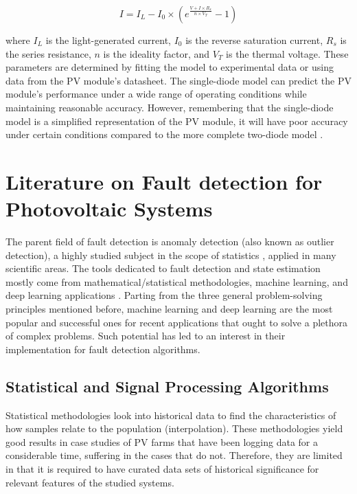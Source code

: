 \begin{equation}
I = I_{L} - I_{0} \times (e^{\frac{V + I \times R_{s}}{n \times V_T}} - 1)
\end{equation}

where $I_{L}$ is the light-generated current, $I_{0}$ is the reverse saturation current, $R_{s}$ is the series resistance, $n$ is the ideality factor, and $V_{T}$ is the thermal voltage. These parameters are determined by fitting the model to experimental data or using data from the PV module's datasheet. The single-diode model can predict the PV module's performance under a wide range of operating conditions while maintaining reasonable accuracy. However, remembering that the single-diode model is a simplified representation of the PV module, it will have poor accuracy under certain conditions compared to the more complete two-diode model \cite{Godina2017}.


\section{Literature on Fault detection for Photovoltaic Systems}

The parent field of fault detection is anomaly detection (also known as outlier detection), a highly studied subject in the scope of statistics \cite{Prasad2009}, applied in many scientific areas. The tools dedicated to fault detection and state estimation mostly come from mathematical/statistical methodologies, machine learning, and deep learning applications \cite{AIPV}. Parting from the three general problem-solving principles mentioned before, machine learning and deep learning are the most popular and successful ones for recent applications that ought to solve a plethora of complex problems. Such potential has led to an interest in their implementation for fault detection algorithms.

\subsection{Statistical and Signal Processing Algorithms}

Statistical methodologies look into historical data to find the characteristics of how samples relate to the population (interpolation). These methodologies yield good results in case studies of PV farms that have been logging data for a considerable time, suffering in the cases that do not. Therefore, they are limited in that it is required to have curated data sets of historical significance for relevant features of the studied systems.

